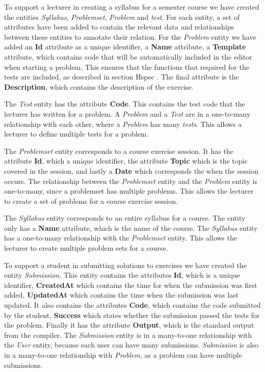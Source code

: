 To support a lecturer in creating a syllabus for a semester course we have created the entities \textit{Syllabus}, \textit{Problemset}, \textit{Problem} and \textit{test}. For each entity, a set of attributes have been added to contain the relevant data and relationships between these entities to annotate their relation.
For the \textit{Problem} entity we have added an \textbf{Id} attribute as a unique identifier, a \textbf{Name} attribute, a \textbf{Template} attribute, which contains code that will be automatically included in the editor when starting a problem. This ensures that the functions that required for the tests are included, as described in section Hspec . The final attribute is the \textbf{Description}, which contains the description of the exercise.

The \textit{Test} entity has the attribute \textbf{Code}. This contains the test code that the lecturer has written for a problem. A \textit{Problem} and a \textit{Test} are in a one-to-many relationship with each other, where a \textit{Problem} has many \textit{tests}. This allows a lecturer to define multiple tests for a problem.

The \textit{Problemset} entity corresponds to a course exercise session. It has the attribute \textbf{Id}, which a unique identifier, the attribute \textbf{Topic} which is the topic covered in the session, and lastly a \textbf{Date} which corresponds the when the session occurs. The relationship between the \textit{Problemset} entity and the \textit{Problem} entity is one-to-many, since a problemset has multiple problems. This allows the lecturer to create a set of problems for a course exercise session.

The \textit{Syllabus} entity corresponds to an entire syllabus for a course. The entity only has a \textbf{Name} attribute, which is the name of the course. The \textit{Syllabus} entity has a one-to-many relationship with the \textit{Problemset} entity. This allows the lecturer to create multiple problem sets for a course.

To support a student in submitting solutions to exercises we have created the entity \textit{Submission}. This entity contains the attributes \textbf{Id}, which is a unique identifier, \textbf{CreatedAt} which contains the time for when the submission was first added, \textbf{UpdatedAt} which contains the time when the submission was last updated. It also contains the attributes \textbf{Code}, which contains the code submitted by the student, \textbf{Success} which states whether the submission passed the tests for the problem. Finally it has the attribute \textbf{Output}, which is the standard output from the compiler.
The \textit{Submission} entity is in a many-to-one relationship with the \textit{User} entity, because each user can have many submissions. \textit{Submission} is also in a many-to-one relationship with \textit{Problem}, as a problem can have multiple submissions.

